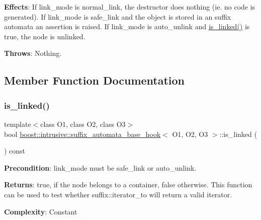 {\bfseries Effects}\+: If link\+\_\+mode is {\ttfamily normal\+\_\+link}, the destructor does nothing (ie. no code is generated). If link\+\_\+mode is {\ttfamily safe\+\_\+link} and the object is stored in an suffix automata an assertion is raised. If link\+\_\+mode is {\ttfamily auto\+\_\+unlink} and {\ttfamily \hyperlink{classboost_1_1intrusive_1_1suffix__automata__base__hook_a4ea824934793a699459376ee845484f6}{is\+\_\+linked()}} is true, the node is unlinked.

{\bfseries Throws}\+: Nothing. 

\subsection{Member Function Documentation}
\mbox{\label{classboost_1_1intrusive_1_1suffix__automata__base__hook_a4ea824934793a699459376ee845484f6}} 
\subsubsection{\texorpdfstring{is\+\_\+linked()}{is\_linked()}}
{\footnotesize\ttfamily template$<$class O1, class O2, class O3$>$ \\
bool \hyperlink{classboost_1_1intrusive_1_1suffix__automata__base__hook}{boost\+::intrusive\+::suffix\+\_\+automata\+\_\+base\+\_\+hook}$<$ O1, O2, O3 $>$\+::is\+\_\+linked (\begin{DoxyParamCaption}{ }\end{DoxyParamCaption}) const}

{\bfseries Precondition}\+: link\+\_\+mode must be {\ttfamily safe\+\_\+link} or {\ttfamily auto\+\_\+unlink}.

{\bfseries Returns}\+: true, if the node belongs to a container, false otherwise. This function can be used to test whether {\ttfamily suffix\+::iterator\+\_\+to} will return a valid iterator.

{\bfseries Complexity}\+: Constant \mbox{\label{classboost_1_1intrusive_1_1suffix__automata__base__hook_a5d52d6dc1f73d4df70df3eba344429e3}} 
